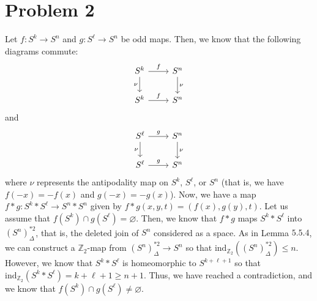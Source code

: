 \documentclass[12pt]{article}
\newcommand{\zz}{\mathbb Z}
\begin{document}
\section*{Problem 2}
Let $f: S^k \rightarrow S^n$ and $g: S^\ell \rightarrow S^n$ be odd maps. Then, we know that the following diagrams commute:
\[ \begin{tikzcd}
S^k \arrow{r}{f} \arrow[swap]{d}{\nu} & S^n \arrow{d}{\nu} \\%
S^k \arrow{r}{f}& S^n
\end{tikzcd}
\] and
\[ \begin{tikzcd}
S^\ell \arrow{r}{g} \arrow[swap]{d}{\nu} & S^n \arrow{d}{\nu} \\%
S^\ell \arrow{r}{g} & S^n
\end{tikzcd}
\] where $\nu$ represents the antipodality map on $S^k$, $S^\ell$, or $S^n$ (that is, we have $f(-x) = -f(x)$ and $g(-x) = - g(x)$). Now, we have a map $f * g: S^k * S^\ell \rightarrow S^{n} * S^{n}$ given by $f * g(x,y,t) = (f(x),g(y),t)$. Let us assume that $f(S^k) \cap g(S^\ell) = \varnothing$. Then, we know that $f * g$ maps $S^k * S^\ell$ into $(S^n)^{*2}_{\Delta}$, that is, the deleted join of $S^n$ considered as a space. As in Lemma $5.5.4$, we can construct a $\zz_2$-map from $(S^n)^{*2}_{\Delta} \rightarrow S^n$ so that $\text{ind}_{\zz_2}((S^n)^{*2}_{\Delta}) \leq n$. However, we know that $S^k * S^\ell$ is homeomorphic to $S^{k+\ell+1}$ so that $\text{ind}_{\zz_2}(S^k * S^\ell) = k+\ell+1 \geq n + 1$. Thus, we have reached a contradiction, and we know that $f(S^k) \cap g(S^\ell) \neq \varnothing$. 
\end{document}
